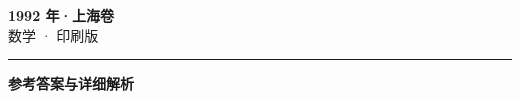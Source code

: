 \documentclass[zihao=5, a4paper]{ctexart}
\begin{document}
\begin{center}
  {\Large\bfseries 1992 年·上海卷}\\[4pt]
  {\large 数学 · 印刷版}
\end{center}
\medskip
{}

\par\bigskip\hrule\bigskip
{}
\begin{center}{\large\bfseries 参考答案与详细解析}\end{center}
\smallskip

\end{document}

